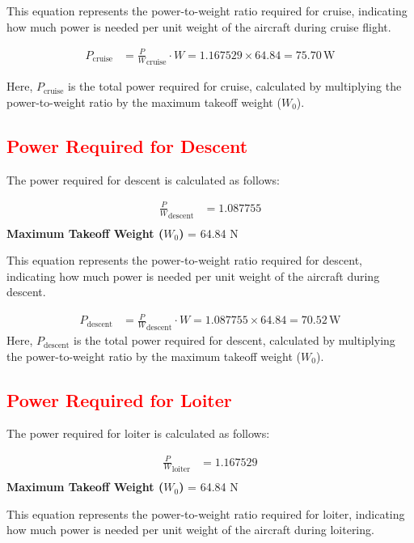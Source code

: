 \documentclass[12 pt]{article}
\begin{document}
This equation represents the power-to-weight ratio required for cruise, indicating how much power is needed per unit weight of the aircraft during cruise flight.

\begin{align*}
P_{\text{cruise}} &= \frac{P}{W}_{\text{cruise}} \cdot W = 1.167529 \times 64.84 = 75.70 \, \text{W} \tag{3.27}
\end{align*}

Here, $P_{\text{cruise}}$ is the total power required for cruise, calculated by multiplying the power-to-weight ratio by the maximum takeoff weight ($W_0$).

\subsection{\textcolor{red}{Power Required for Descent}}

The power required for descent is calculated as follows:

\begin{align*}
\frac{P}{W}_{\text{descent}} &= 1.087755 \tag{3.28} \\
\end{align*}
\textbf{Maximum Takeoff Weight ($W_0$)} = 64.84 N

This equation represents the power-to-weight ratio required for descent, indicating how much power is needed per unit weight of the aircraft during descent.

\begin{align*}
P_{\text{descent}} &= \frac{P}{W}_{\text{descent}} \cdot W = 1.087755 \times 64.84 = 70.52 \, \text{W} \tag{3.29}
\end{align*}
Here, $P_{\text{descent}}$ is the total power required for descent, calculated by multiplying the power-to-weight ratio by the maximum takeoff weight ($W_0$).

\subsection{\textcolor{red}{Power Required for Loiter}}

The power required for loiter is calculated as follows:

\begin{align*}
\frac{P}{W}_{\text{loiter}} &= 1.167529 \tag{3.30} \\
\end{align*}
\textbf{Maximum Takeoff Weight ($W_0$)} = 64.84 N

This equation represents the power-to-weight ratio required for loiter, indicating how much power is needed per unit weight of the aircraft during loitering.
\end{document}
